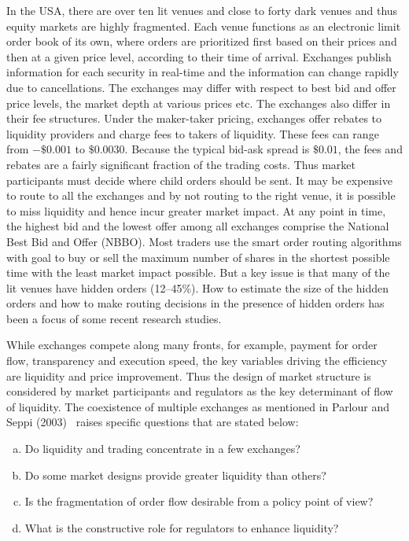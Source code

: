 In the USA, there are over ten lit venues and close to forty dark venues and thus equity markets are highly fragmented. Each venue functions as an electronic limit order book of its own, where orders are prioritized first based on their prices and then at a given price level, according to their time of arrival. Exchanges publish information for each security in real-time and the information can change rapidly due to cancellations. The exchanges may differ with respect to best bid and offer price levels, the market depth at various prices etc. The exchanges also differ in their fee structures. Under the maker-taker pricing, exchanges offer rebates to liquidity providers and charge fees to takers of liquidity. These fees can range from $-\$0.001$ to $\$0.0030$. Because the typical bid-ask spread is $\$0.01$, the fees and rebates are a fairly significant fraction of the trading costs. Thus market participants must decide where child orders should be sent. It may be expensive to route to all the exchanges and by not routing to the right venue, it is possible to miss liquidity and hence incur greater market impact. At any point in time, the highest bid and the lowest offer among all exchanges comprise the National Best Bid and Offer (NBBO). Most traders use the smart order routing algorithms with goal to buy or sell the maximum number of shares in the shortest possible time with the least market impact possible. But a key issue is that many of the lit venues have hidden orders (12--45\%). How to estimate the size of the hidden orders and how to make routing decisions in the presence of hidden orders has been a focus of some recent research studies.


While exchanges compete along many fronts, for example, payment for order flow, transparency and execution speed, the key variables driving the efficiency are liquidity and price improvement. Thus the design of market structure is considered by market participants and regulators as the key determinant of flow of liquidity. The coexistence of multiple exchanges as mentioned in Parlour and Seppi (2003)~\cite{parlour2003} raises specific questions that are stated below:
        \begin{enumerate}[a)]
        \item Do liquidity and trading concentrate in a few exchanges?
        \item Do some market designs provide greater liquidity than others?
        \item Is the fragmentation of order flow desirable from a policy point of view?
        \item What is the constructive role for regulators to enhance liquidity?
        \end{enumerate}


